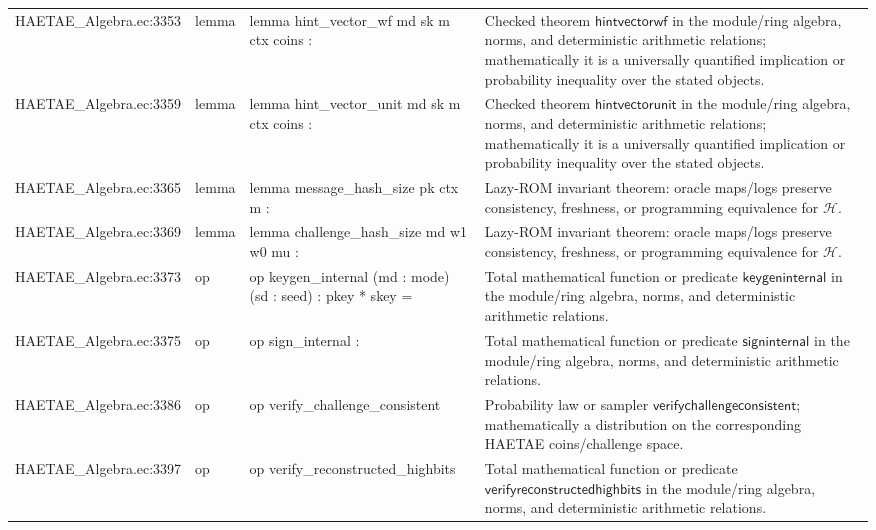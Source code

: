 \documentclass[10pt]{article}
\begin{document}
\begin{longtable}{L{0.11\textwidth}L{0.055\textwidth}L{0.385\textwidth}L{0.41\textwidth}}
HAETAE\_\allowbreak{}Algebra.\allowbreak{}ec:\allowbreak{}3353 & lemma & {\ttfamily\scriptsize lemma hint\_\allowbreak{}vector\_\allowbreak{}wf md sk m ctx coins :} & Checked theorem $\mathsf{hintvectorwf}$ in the module/ring algebra, norms, and deterministic arithmetic relations; mathematically it is a universally quantified implication or probability inequality over the stated objects. \\
HAETAE\_\allowbreak{}Algebra.\allowbreak{}ec:\allowbreak{}3359 & lemma & {\ttfamily\scriptsize lemma hint\_\allowbreak{}vector\_\allowbreak{}unit md sk m ctx coins :} & Checked theorem $\mathsf{hintvectorunit}$ in the module/ring algebra, norms, and deterministic arithmetic relations; mathematically it is a universally quantified implication or probability inequality over the stated objects. \\
HAETAE\_\allowbreak{}Algebra.\allowbreak{}ec:\allowbreak{}3365 & lemma & {\ttfamily\scriptsize lemma message\_\allowbreak{}hash\_\allowbreak{}size pk ctx m :} & Lazy-ROM invariant theorem: oracle maps/logs preserve consistency, freshness, or programming equivalence for $\mathcal H$. \\
HAETAE\_\allowbreak{}Algebra.\allowbreak{}ec:\allowbreak{}3369 & lemma & {\ttfamily\scriptsize lemma challenge\_\allowbreak{}hash\_\allowbreak{}size md w1 w0 mu :} & Lazy-ROM invariant theorem: oracle maps/logs preserve consistency, freshness, or programming equivalence for $\mathcal H$. \\
HAETAE\_\allowbreak{}Algebra.\allowbreak{}ec:\allowbreak{}3373 & op & {\ttfamily\scriptsize op keygen\_\allowbreak{}internal (md : mode) (sd : seed) : pkey * skey =} & Total mathematical function or predicate $\mathsf{keygeninternal}$ in the module/ring algebra, norms, and deterministic arithmetic relations. \\
HAETAE\_\allowbreak{}Algebra.\allowbreak{}ec:\allowbreak{}3375 & op & {\ttfamily\scriptsize op sign\_\allowbreak{}internal :} & Total mathematical function or predicate $\mathsf{signinternal}$ in the module/ring algebra, norms, and deterministic arithmetic relations. \\
HAETAE\_\allowbreak{}Algebra.\allowbreak{}ec:\allowbreak{}3386 & op & {\ttfamily\scriptsize op verify\_\allowbreak{}challenge\_\allowbreak{}consistent} & Probability law or sampler $\mathsf{verifychallengeconsistent}$; mathematically a distribution on the corresponding HAETAE coins/challenge space. \\
HAETAE\_\allowbreak{}Algebra.\allowbreak{}ec:\allowbreak{}3397 & op & {\ttfamily\scriptsize op verify\_\allowbreak{}reconstructed\_\allowbreak{}highbits} & Total mathematical function or predicate $\mathsf{verifyreconstructedhighbits}$ in the module/ring algebra, norms, and deterministic arithmetic relations. \\

\end{longtable}
\end{document}
